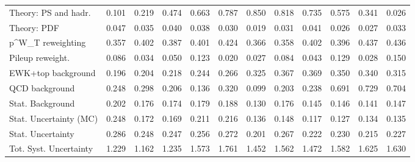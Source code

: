 \begin{tabular}{l|p{0.6cm}p{0.6cm}p{0.6cm}p{0.6cm}p{0.6cm}p{0.6cm}p{0.6cm}p{0.6cm}p{0.6cm}p{0.6cm}p{0.6cm}}
Theory: PS and hadr.                     & 0.101 & 0.219 & 0.474 & 0.663 & 0.787 & 0.850 & 0.818 & 0.735 & 0.575 & 0.341 & 0.026 \\
Theory: PDF                              & 0.047 & 0.035 & 0.040 & 0.038 & 0.030 & 0.019 & 0.031 & 0.041 & 0.026 & 0.027 & 0.033 \\
p^{W}_{T} reweighting                    & 0.357 & 0.402 & 0.387 & 0.401 & 0.424 & 0.366 & 0.358 & 0.402 & 0.396 & 0.437 & 0.436 \\
Pileup reweight.                         & 0.086 & 0.034 & 0.050 & 0.123 & 0.020 & 0.027 & 0.084 & 0.043 & 0.129 & 0.028 & 0.150 \\
EWK+top background                       & 0.196 & 0.204 & 0.218 & 0.244 & 0.266 & 0.325 & 0.367 & 0.369 & 0.350 & 0.340 & 0.315 \\
QCD background                           & 0.248 & 0.298 & 0.206 & 0.136 & 0.320 & 0.099 & 0.203 & 0.238 & 0.691 & 0.729 & 0.704 \\
Stat. Background                         & 0.202 & 0.176 & 0.174 & 0.179 & 0.188 & 0.130 & 0.176 & 0.145 & 0.146 & 0.141 & 0.147 \\
Stat. Uncertainty (MC)                   & 0.248 & 0.172 & 0.169 & 0.211 & 0.216 & 0.136 & 0.148 & 0.117 & 0.127 & 0.134 & 0.135 \\
\hline
Stat. Uncertainty                        & 0.286 & 0.248 & 0.247 & 0.256 & 0.272 & 0.201 & 0.267 & 0.222 & 0.230 & 0.215 & 0.227 \\
\hline
Tot. Syst. Uncertainty                   & 1.229 & 1.162 & 1.235 & 1.573 & 1.761 & 1.452 & 1.562 & 1.472 & 1.582 & 1.625 & 1.630 \\
\hline
\end{tabular}
